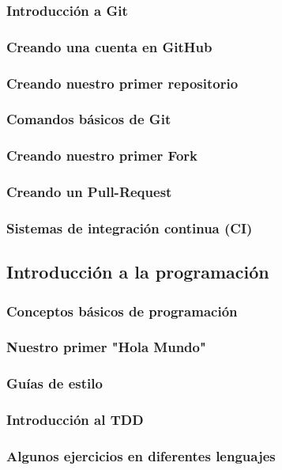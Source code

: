 \subsubsection{Introducción a Git}
\subsubsection{Creando una cuenta en GitHub}
\subsubsection{Creando nuestro primer repositorio}
\subsubsection{Comandos básicos de Git}
\subsubsection{Creando nuestro primer Fork}
\subsubsection{Creando un Pull-Request}
\subsubsection{Sistemas de integración continua (CI)}

\subsection{Introducción a la programación}

\subsubsection{Conceptos básicos de programación}
\subsubsection{Nuestro primer "Hola Mundo"}
\subsubsection{Guías de estilo}
\subsubsection{Introducción al TDD}
\subsubsection{Algunos ejercicios en diferentes lenguajes}

